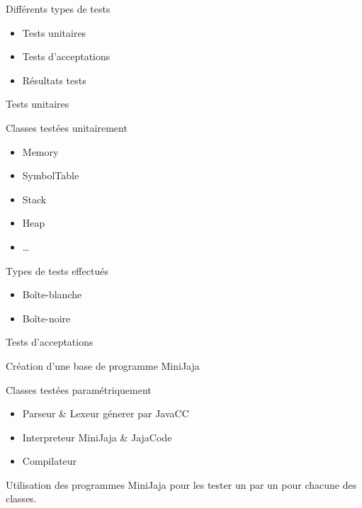 \begin{chapter}{}{Différents types de tests}
    \begin{itemize}
          \item Tests unitaires
          \item Tests d'acceptations
          \item Résultats tests
    \end{itemize}
\end{chapter}

\begin{frame}{Tests unitaires}
    \begin{block}{Classes testées unitairement}
        \begin{itemize}
            \item Memory
            \item SymbolTable
            \item Stack
            \item Heap
            \item \dots
        \end{itemize}
    \end{block}
    \begin{block}{Types de tests effectués}
        \begin{itemize}
            \item Boîte-blanche
            \item Boîte-noire
        \end{itemize}
    \end{block}

\end{frame}

\begin{frame}{Tests d'acceptations}
    \begin{block}{}
        \centering
        Création d'une base de programme MiniJaja
    \end{block}
    \begin{block}{Classes testées paramétriquement}
        \begin{itemize}
            \item Parseur \& Lexeur génerer par JavaCC
            \item Interpreteur MiniJaja \& JajaCode
            \item Compilateur
        \end{itemize}
    \end{block}
    \begin{block}{}
        Utilisation des programmes MiniJaja pour les tester un par un 
        pour chacune des classes.
    \end{block}
\end{frame}

